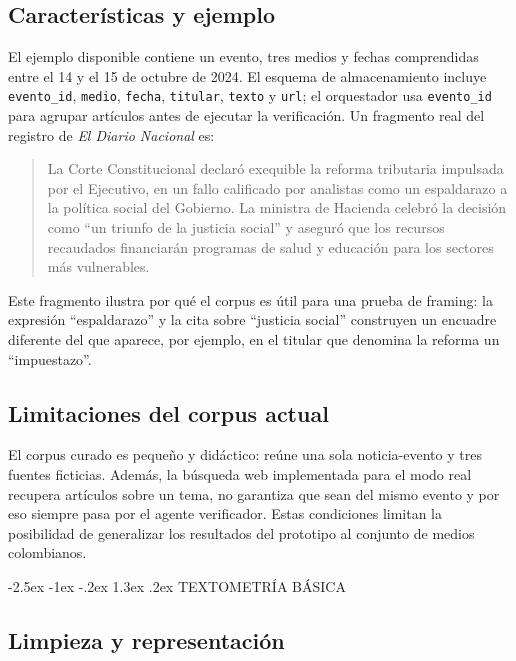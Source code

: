 \documentclass[10pt,twocolumn]{article}
\makeatletter
\renewcommand{\section}{\@startsection{section}{1}{\z@}%
  {-2.5ex \@plus -1ex \@minus -.2ex}%
  {1.3ex \@plus .2ex}%
  {\normalfont\large\bfseries\centering}}
\makeatother
\begin{document}
\subsection{Características y ejemplo}

El ejemplo disponible contiene un evento, tres medios y fechas comprendidas
entre el 14 y el 15 de octubre de 2024. El esquema de almacenamiento incluye
\texttt{evento\_id}, \texttt{medio}, \texttt{fecha}, \texttt{titular}, \texttt{texto} y \texttt{url}; el orquestador usa
\texttt{evento\_id} para agrupar artículos antes de ejecutar la verificación. Un
fragmento real del registro de \emph{El Diario Nacional} es:

\begin{quote}
La Corte Constitucional declaró exequible la reforma tributaria impulsada por
el Ejecutivo, en un fallo calificado por analistas como un espaldarazo a la
política social del Gobierno. La ministra de Hacienda celebró la decisión como
``un triunfo de la justicia social'' y aseguró que los recursos recaudados
financiarán programas de salud y educación para los sectores más vulnerables.
\end{quote}

Este fragmento ilustra por qué el corpus es útil para una prueba de framing:
la expresión ``espaldarazo'' y la cita sobre ``justicia social'' construyen un
encuadre diferente del que aparece, por ejemplo, en el titular que denomina
la reforma un ``impuestazo''.

\subsection{Limitaciones del corpus actual}

El corpus curado es pequeño y didáctico: reúne una sola noticia-evento y tres
fuentes ficticias. Además, la búsqueda web implementada para el modo real
recupera artículos sobre un tema, no garantiza que sean del mismo evento y
por eso siempre pasa por el agente verificador. Estas condiciones limitan la
posibilidad de generalizar los resultados del prototipo al conjunto de medios
colombianos.

\section{TEXTOMETRÍA BÁSICA}

\subsection{Limpieza y representación}
\end{document}
